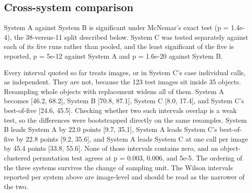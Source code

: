 \documentclass[12pt,letterpaper]{article}
\begin{document}
\subsection{Cross-system comparison}

System A against System B is significant under McNemar's exact test
(p = 1.4e-4), the 38-versus-11 split described below. System C was
tested separately against each of its five runs rather than pooled, and
the least significant of the five is reported, p = 5e-12 against System
A and p = 1.6e-20 against System B.

Every interval quoted so far treats images, or in System C's case
individual calls, as independent. They are not, because the 123 test
images sit inside 35 objects. Resampling whole objects with replacement
widens all of them. System A becomes [46.2, 68.2], System B
[70.8, 87.1], System C [8.0, 17.4], and System C's best-of-five
[24.6, 45.5]. Checking whether two such intervals overlap is a weak
test, so the differences were bootstrapped directly on the same
resamples. System B leads System A by 22.0 points [9.7, 35.1], System A
leads System C's best-of-five by 22.8 points [9.2, 35.6], and System A
leads System C at one call per image by 45.4 points [33.8, 55.6]. None
of those intervals contains zero, and an object-clustered permutation
test agrees at p = 0.003, 0.006, and 5e-5. The ordering of the three
systems survives the change of sampling unit. The Wilson intervals
reported per system above are image-level and should be read as the
narrower of the two.
\end{document}
